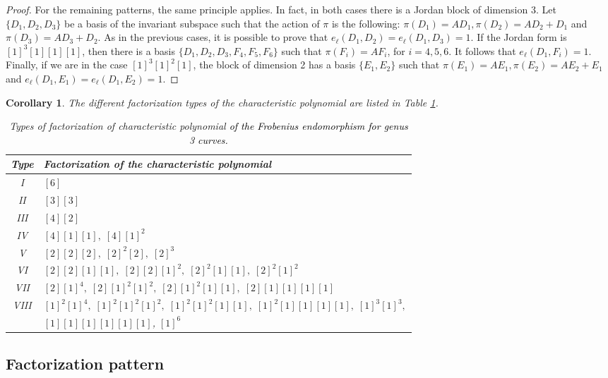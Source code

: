 \documentclass[11pt,a4paper]{article}
\theoremstyle{plain}
\newtheorem{corollary}[theorem]{Corollary}
\theoremstyle{definition}
\theoremstyle{remark}
\newcommand{\azul}[1]{\textcolor{black}{#1}}
\begin{document}
\begin{proof}
For the remaining patterns, the same principle applies. In fact, in both cases there is a Jordan block of dimension 3. Let $\{D_1,D_2,D_3\}$ be a basis of the invariant subspace such that the action of $\pi$ is the following: $\pi(D_1)=AD_1, \pi(D_2)=AD_2+D_1$ and $\pi(D_3)=AD_3+D_2$. As in the previous cases, it is possible to prove that $e_{\ell}(D_1,D_2)=e_{\ell}(D_1,D_3)=1$. If the Jordan form is $[1]^3[1][1][1]$, then there is a basis $\{D_1,D_2,D_3,F_4,F_5,F_6\}$
such that $\pi(F_i)=AF_i$, for $i=4,5,6$. It follows that $e_{\ell}(D_1,F_i)=1$. 
Finally, if we are in the case $[1]^3[1]^2[1]$, the block of dimension 2 has a basis $\{E_1,E_2\}$ such that $\pi(E_1)=AE_1,\pi(E_2)=AE_2+E_1$ and  $e_{\ell}(D_1,E_1)=e_{\ell}(D_1,E_2)=1$.

\end{proof}

\begin{corollary} The different factorization types  of the characteristic polynomial are listed in Table \ref{tablatipos}.
     \begin{table}[]
         \centering
\begin{tabular}{|c|l|}
\hline
\textbf{Type} & \textbf{Factorization of the characteristic polynomial} \\ \hline
I   & $[6]$ \\ \hline
II  & $[3][3]$ \\ \hline
III & $[4][2]$ \\ \hline
IV  & $[4][1][1],\; [4][1]^2$ \\ \hline
V   & $[2][2][2],\; [2]^2[2],\; [2]^3$ \\ \hline
VI  & $[2][2][1][1],\; [2][2][1]^2,\; [2]^2[1][1],\; [2]^2[1]^2$ \\ \hline
VII & $[2][1]^4,\; [2][1]^2[1]^2,\; [2][1]^2[1][1],\; [2][1][1][1][1]$ \\ \hline
VIII& $[1]^2[1]^4,\; [1]^2[1]^2[1]^2,\; [1]^2[1]^2[1][1],\; [1]^2[1][1][1][1],\; [1]^3[1]^3,$\\ & $[1][1][1][1][1][1]$,  $[1]^6$ \\ \hline
\end{tabular}
\caption{Types of factorization of characteristic polynomial \azul{of the Frobenius endomorphism for genus 3 curves.}}
         \label{tablatipos}
     \end{table}
\end{corollary} 

\subsection{Factorization pattern}
\end{document}
